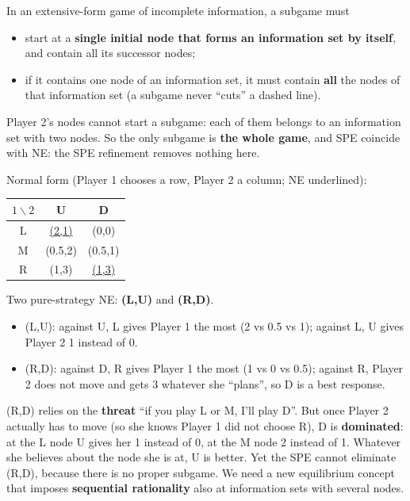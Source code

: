 \documentclass[11pt,a4paper,openany]{book}
\begin{document}
\begin{defnbox}[title=Subgame (incomplete information)]
In an extensive-form game of incomplete information, a subgame must
\begin{itemize}
  \item start at a \textbf{single initial node that forms an information set by itself}, and
        contain all its successor nodes;
  \item if it contains one node of an information set, it must contain \textbf{all} the
        nodes of that information set (a subgame never ``cuts'' a dashed line).
\end{itemize}
\end{defnbox}

\begin{exbox}[title=Example 1 has no proper subgame]
Player 2's nodes cannot start a subgame: each of them belongs to an information set with two
nodes. So the only subgame is \textbf{the whole game}, and SPE coincide with NE: the SPE
refinement removes nothing here.
\end{exbox}


\begin{propbox}[title=Example 1: Nash equilibria]
Normal form (Player 1 chooses a row, Player 2 a column; NE underlined):
\begin{center}
\begin{tabular}{c|cc}
$1 \backslash 2$ & U & D \\ \hline
L & \underline{(2,1)} & (0,0) \\
M & (0.5,2) & (0.5,1) \\
R & (1,3) & \underline{(1,3)}
\end{tabular}
\end{center}
Two pure-strategy NE: \textbf{(L,U)} and \textbf{(R,D)}.
\begin{itemize}
  \item (L,U): against U, L gives Player 1 the most (2 vs 0.5 vs 1); against L, U gives
        Player 2 1 instead of 0.
  \item (R,D): against D, R gives Player 1 the most (1 vs 0 vs 0.5); against R, Player 2 does
        not move and gets 3 whatever she ``plans'', so D is a best response.
\end{itemize}
\end{propbox}

\begin{warnbox}[title={(R,D) is not credible}]
(R,D) relies on the \textbf{threat} ``if you play L or M, I'll play D''. But once Player 2
actually has to move (so she knows Player 1 did not choose R), D is \textbf{dominated}: at the
L node U gives her 1 instead of 0, at the M node 2 instead of 1. Whatever she believes about
the node she is at, U is better. Yet the SPE cannot eliminate (R,D), because there is no
proper subgame. We need a new equilibrium concept that imposes \textbf{sequential
rationality} also at information sets with several nodes.
\end{warnbox}
\end{document}
